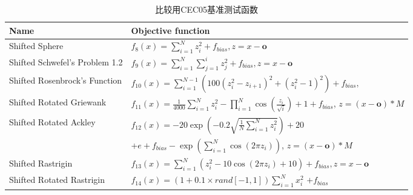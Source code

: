 \begin{table*}[!htb]
\renewcommand\arraystretch{.2}
\begin{center}
\caption{比较用CEC05基准测试函数}
\label{Tab:CEC05}
\vspace{0.5em}\centering
\begin{tabularx}{1.\textwidth}{p{4.2cm} p{12.5cm}}
\hline
Name &  Objective function \\
\hline
Shifted Sphere &  $f_8(x)=\sum_{i=1}^N z_i^2+f_{bias}, z=x-\bm o$\\
Shifted Schwefel's Problem 1.2 &  $f_{9}(x)=\sum_{i=1}^N \sum _{j=1}^i z_j^2+f_{bias}, z=x-\bm o$\\
Shifted Rosenbrock's Function &  $f_{10}(x)=\sum_{i=1}^{N-1} (100(z_i^2-z_{i+1})^2+(z_i^2-1)^2 )+f_{bias},$\\
Shifted Rotated Griewank&   $f_{11}(x)=\frac{1}{4000}\sum_{i=1}^{N}{z_i^2}-\prod_{i=1}^{N}\cos(\frac{z_i}{\sqrt{i}})+1+f_{bias}$, $z=(x-\bm o)\ast M$\\
Shifted Rotated Ackley &   $f_{12}(x)=-20\exp(-0.2 \sqrt{\frac{1}{N}\sum_{i=1}^{N}{z_i^2}})+20$\\
                         &\qquad +$e+f_{bias} -\exp(\sum_{i=1}^N\cos(2\pi z_i))$, $z=(x-\bm o)\ast M$\\
Shifted Rastrigin &  $f_{13}(x)=\sum_{i=1}^{N}(z_i^2-10\cos(2\pi z_i)+10)+f_{bias}, z=x-\bm o$\\
Shifted Rotated  Rastrigin&  $f_{14}(x)=(1+0.1\times rand[-1,1])\sum_{i=1}^N x_i^2$ $+f_{bias}$\\
\hline
\end{tabularx}
\end{center}
\end{table*}
